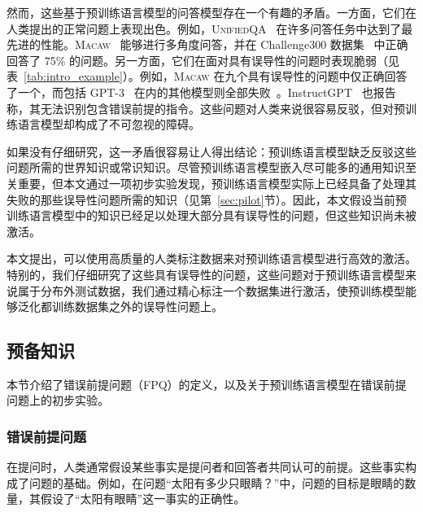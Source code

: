 然而，这些基于预训练语言模型的问答模型存在一个有趣的矛盾。一方面，它们在人类提出的正常问题上表现出色。例如，\textsc{UnifiedQA}~\cite{khashabi-etal-2020-unifiedqa} 在许多问答任务中达到了最先进的性能。\textsc{Macaw}~\cite{tafjord2021general} 能够进行多角度问答，并在 Challenge300 数据集~\cite{tafjord2021general} 中正确回答了 75\% 的问题。另一方面，它们在面对具有误导性的问题时表现脆弱（见表~\ref{tab:intro_example}）。例如，\textsc{Macaw} 在九个具有误导性的问题中仅正确回答了一个，而包括 GPT-3~\cite{brown2020language} 在内的其他模型则全部失败~\cite{tafjord2021general}。InstructGPT~\cite{ouyang2022training} 也报告称，其无法识别包含错误前提的指令。这些问题对人类来说很容易反驳，但对预训练语言模型却构成了不可忽视的障碍。

如果没有仔细研究，这一矛盾很容易让人得出结论：预训练语言模型缺乏反驳这些问题所需的世界知识或常识知识。尽管预训练语言模型嵌入尽可能多的通用知识至关重要，但本文通过一项初步实验发现，预训练语言模型实际上已经具备了处理其失败的那些误导性问题所需的知识（见第~\ref{sec:pilot}节）。因此，本文假设当前预训练语言模型中的知识已经足以处理大部分具有误导性的问题，但这些知识尚未被激活。

本文提出，可以使用高质量的人类标注数据来对预训练语言模型进行高效的激活。特别的，我们仔细研究了这些具有误导性的问题，这些问题对于预训练语言模型来说属于分布外测试数据，我们通过精心标注一个数据集进行激活，使预训练模型能够泛化都训练数据集之外的误导性问题上。


\subsection{预备知识}
本节介绍了错误前提问题（FPQ）的定义，以及关于预训练语言模型在错误前提问题上的初步实验。

\subsubsection{错误前提问题}
在提问时，人类通常假设某些事实是提问者和回答者共同认可的前提。这些事实构成了问题的基础。例如，在问题“太阳有多少只眼睛？”中，问题的目标是眼睛的数量，其假设了“太阳有眼睛”这一事实的正确性。

